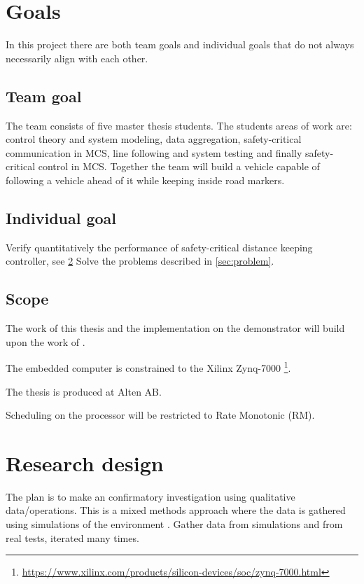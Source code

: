 \section{Goals}
In this project there are both team goals and individual goals that do not always necessarily align with each other. 

\subsection{Team goal}
The team consists of five master thesis students. The students areas of work are: control theory and system modeling, data aggregation, safety-critical communication in MCS, line following and system testing and finally safety-critical control in MCS. Together the team will build a vehicle capable of following a vehicle ahead of it while keeping inside road markers.

\subsection{Individual goal}
Verify quantitatively the performance of safety-critical distance keeping controller, see \ref{sec:research} Solve the problems described in \ref{sec:problem}.

\subsection{Scope}
\label{sec:scope}
The work of this thesis and the implementation on the demonstrator will build upon the work of \cite{zaki2016}.

The embedded computer is constrained to the Xilinx Zynq-7000 \footnote{\url{https://www.xilinx.com/products/silicon-devices/soc/zynq-7000.html}}. 

The thesis is produced at Alten AB. %


Scheduling on the processor will be restricted to Rate Monotonic (RM).

\section{Research design}
\label{sec:research}
The plan is to make an confirmatory investigation using qualitative data/operations. This is a mixed methods approach where the data is gathered using simulations of the environment \cite{creswell}. Gather data from simulations and from real tests, iterated many times.


